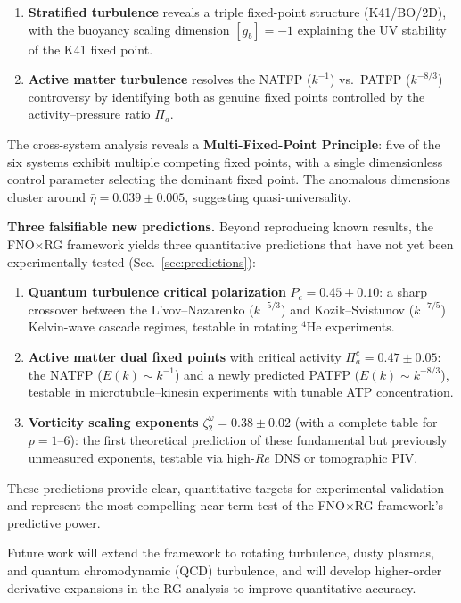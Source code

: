 \begin{enumerate}
\item \textbf{Stratified turbulence} reveals a triple fixed-point structure (K41/BO/2D), with the buoyancy scaling dimension $[g_b]=-1$ explaining the UV stability of the K41 fixed point.

\item \textbf{Active matter turbulence} resolves the NATFP ($k^{-1}$) vs.\ PATFP ($k^{-8/3}$) controversy by identifying both as genuine fixed points controlled by the activity--pressure ratio $\Pi_a$.
\end{enumerate}

The cross-system analysis reveals a \textbf{Multi-Fixed-Point Principle}: five of the six systems exhibit multiple competing fixed points, with a single dimensionless control parameter selecting the dominant fixed point. The anomalous dimensions cluster around $\bar{\eta} = 0.039\pm 0.005$, suggesting quasi-universality.

\textbf{Three falsifiable new predictions.}
Beyond reproducing known results, the FNO$\times$RG framework yields three quantitative predictions that have not yet been experimentally tested (Sec.~\ref{sec:predictions}):
\begin{enumerate}
\item \textbf{Quantum turbulence critical polarization} $P_c=0.45\pm 0.10$: a sharp crossover between the L'vov--Nazarenko ($k^{-5/3}$) and Kozik--Svistunov ($k^{-7/5}$) Kelvin-wave cascade regimes, testable in rotating $^4$He experiments.
\item \textbf{Active matter dual fixed points} with critical activity $\Pi_a^c=0.47\pm 0.05$: the NATFP ($E(k)\sim k^{-1}$) and a newly predicted PATFP ($E(k)\sim k^{-8/3}$), testable in microtubule--kinesin experiments with tunable ATP concentration.
\item \textbf{Vorticity scaling exponents} $\zeta_2^\omega=0.38\pm 0.02$ (with a complete table for $p=1$--$6$): the first theoretical prediction of these fundamental but previously unmeasured exponents, testable via high-$Re$ DNS or tomographic PIV.
\end{enumerate}
These predictions provide clear, quantitative targets for experimental validation and represent the most compelling near-term test of the FNO$\times$RG framework's predictive power.

Future work will extend the framework to rotating turbulence, dusty plasmas, and quantum chromodynamic (QCD) turbulence, and will develop higher-order derivative expansions in the RG analysis to improve quantitative accuracy.

